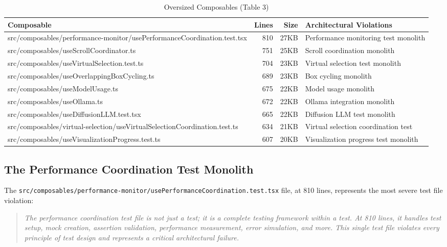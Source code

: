 \documentclass[11pt]{article}
\begin{document}
\begin{table}[ht]
\centering
\begin{tabular}{|p{3.5cm}|r|r|p{4cm}|}
\hline
\textbf{Composable} & \textbf{Lines} & \textbf{Size} & \textbf{Architectural Violations} \\
\hline
src/composables/performance-monitor/usePerformanceCoordination.test.tsx & 810 & 27KB & Performance monitoring test monolith \\
src/composables/useScrollCoordinator.ts & 751 & 25KB & Scroll coordination monolith \\
src/composables/useVirtualSelection.test.ts & 704 & 23KB & Virtual selection test monolith \\
src/composables/useOverlappingBoxCycling.ts & 689 & 23KB & Box cycling monolith \\
src/composables/useModelUsage.ts & 675 & 22KB & Model usage monolith \\
src/composables/useOllama.ts & 672 & 22KB & Ollama integration monolith \\
src/composables/useDiffusionLLM.test.tsx & 665 & 22KB & Diffusion LLM test monolith \\
src/composables/virtual-selection/useVirtualSelectionCoordination.test.ts & 634 & 21KB & Virtual selection coordination test \\
src/composables/useVisualizationProgress.test.ts & 607 & 20KB & Visualization progress test monolith \\
\hline
\end{tabular}
\caption{Oversized Composables (Table 3)}
\end{table}

\subsection{The Performance Coordination Test Monolith}

The \texttt{src/composables/performance-monitor/usePerformanceCoordination.test.tsx} file, at 810 lines, represents the most severe test file violation:

\begin{quote}
\emph{The performance coordination test file is not just a test; it is a complete testing framework within a test. At 810 lines, it handles test setup, mock creation, assertion validation, performance measurement, error simulation, and more. This single test file violates every principle of test design and represents a critical architectural failure.}
\end{quote}
\end{document}
